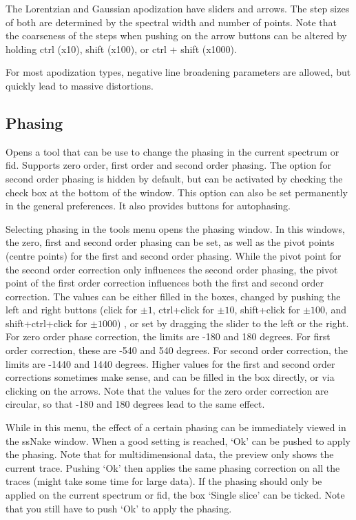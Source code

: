 \documentclass[11pt,a4paper]{article}
\begin{document}
The Lorentzian and Gaussian apodization have sliders and arrows. The step sizes of both are
determined by the spectral width and number of points. Note that the coarseness of the steps when
pushing on the arrow buttons can be altered by holding ctrl (x10), shift (x100), or ctrl + shift
(x1000).

For most apodization types, negative line broadening parameters are allowed, but quickly lead to massive distortions.


\subsection{Phasing}
Opens a tool that can be use to change the phasing in the current spectrum or fid. Supports zero order, first order and second order phasing. The option for second order phasing is hidden by default, but can be activated by checking the check box at the bottom of the window. This option can also be set permanently in the general preferences. It also provides buttons for autophasing.

Selecting phasing in the tools menu opens the phasing window. In this windows, the zero, first and second order phasing can be set, as well as the pivot points (centre points) for the first and second order phasing.
While the pivot point for the second order correction only influences the second order phasing, the pivot point of the first order correction influences both the first and second order correction.
The values can be either filled in the boxes, changed by pushing the left and right buttons (click for
$\pm1$, ctrl+click for $\pm10$, shift+click for $\pm100$, and shift+ctrl+click for $\pm1000$) , or set
by dragging the slider to the left or the right. For zero order phase correction, the limits are -180
and 180 degrees. For first order correction, these are -540 and 540 degrees. For second order
correction, the limits are -1440 and 1440 degrees. Higher values for the first and second order
corrections sometimes make sense, and can be filled in the box directly, or via clicking on the
arrows. Note that the values for the zero order correction are circular, so that -180 and 180 degrees
lead to the same effect.

While in this menu, the effect of a certain phasing can be immediately viewed in the ssNake window.
When a good setting is reached, `Ok' can be pushed to apply the phasing. Note that for
multidimensional data, the preview only shows the current trace. Pushing `Ok' then applies the same
phasing correction on all the traces (might take some time for large data). If the phasing should
only be applied on the current spectrum or fid, the box `Single slice' can be ticked. Note that you
still have to push `Ok' to apply the phasing.
\end{document}
